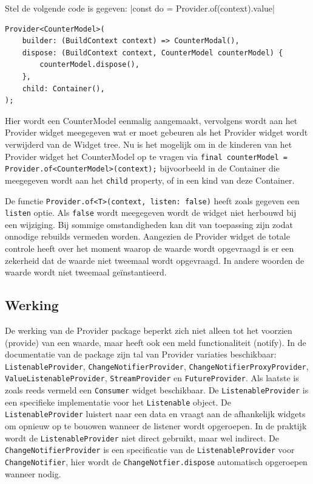 Stel de volgende code is gegeven:
|const do = Provider.of(context).value|
\begin{verbatim}
Provider<CounterModel>(
    builder: (BuildContext context) => CounterModal(),
    dispose: (BuildContext context, CounterModel counterModel) {
        counterModel.dispose(),
    },
    child: Container(),
);
\end{verbatim}

Hier wordt een CounterModel eenmalig aangemaakt, vervolgens wordt aan het Provider widget meegegeven wat er moet gebeuren als het Provider widget wordt verwijderd van de Widget tree. Nu is het mogelijk om in de kinderen van het Provider widget het CounterModel op te vragen via \verb|final counterModel = Provider.of<CounterModel>(context);|
bijvoorbeeld in de Container die meegegeven wordt aan het \verb|child| property, of in een kind van deze Container.

De functie \verb|Provider.of<T>(context, listen: false)| heeft zoals gegeven een \verb|listen| optie. Als \verb|false| wordt meegegeven wordt de widget niet herbouwd bij een wijziging. Bij sommige omstandigheden kan dit van toepassing zijn zodat onnodige rebuilds vermeden worden. Aangezien de Provider widget de totale controle heeft over het moment waarop de waarde wordt opgevraagd is er een zekerheid dat de waarde niet tweemaal wordt opgevraagd. In andere woorden de waarde wordt niet tweemaal geïnstantieerd.

\subsection*{Werking}
De werking van de Provider package beperkt zich niet alleen tot het voorzien (provide) van een waarde, maar heeft ook een meld functionaliteit (notify).
In de documentatie van de package zijn tal van Provider variaties beschikbaar: \verb|ListenableProvider|, \verb|ChangeNotifierProvider|, \verb|ChangeNotifierProxyProvider|, \verb|ValueListenableProvider|, \verb|StreamProvider| en \verb|FutureProvider|. Als laatste is zoals reeds vermeld een \verb|Consumer| widget beschikbaar.
De \verb|ListenableProvider| is een specifieke implementatie voor het \verb|Listenable| object. De \verb|ListenableProvider| luistert naar een data en vraagt aan de afhankelijk widgets om opnieuw op te bouowen wanneer de listener wordt opgeroepen. In de praktijk wordt de \verb|ListenableProvider| niet direct gebruikt, maar wel indirect. De \verb|ChangeNotifierProvider| is een specificatie van de \verb|ListenableProvider| voor \verb|ChangeNotifier|, hier wordt de \verb|ChangeNotfier.dispose| automatisch opgeroepen wanneer nodig.

